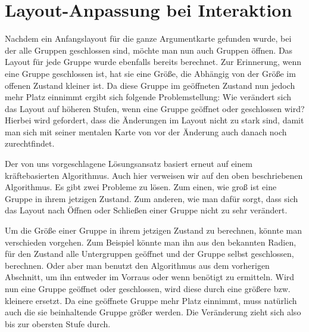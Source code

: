

\section{Layout-Anpassung bei Interaktion}%
Nachdem ein Anfangslayout für die ganze Argumentkarte gefunden wurde, bei der alle Gruppen geschlossen sind, möchte man nun auch Gruppen öffnen. 
Das Layout für jede Gruppe wurde ebenfalls bereits berechnet. Zur Erinnerung, wenn eine Gruppe geschlossen ist, hat sie eine Größe, 
die Abhängig von der Größe im offenen Zustand kleiner ist. 
Da diese Gruppe im geöffneten Zustand nun jedoch mehr Platz einnimmt ergibt sich folgende Problemstellung:
Wie verändert sich das Layout auf höheren Stufen, wenn eine Gruppe geöffnet oder geschlossen wird? 
Hierbei wird gefordert, dass die Änderungen im Layout nicht zu stark sind, damit man sich mit seiner mentalen Karte von vor der Änderung auch danach noch zurechtfindet.

Der von uns vorgeschlagene Lösungsansatz basiert erneut auf einem kräftebasierten Algorithmus. 
Auch hier verweisen wir auf den oben beschriebenen Algorithmus. Es gibt zwei Probleme zu lösen. 
Zum einen, wie groß ist eine Gruppe in ihrem jetzigen Zustand.  
Zum anderen, wie man dafür sorgt, dass sich das Layout nach Öffnen oder Schließen einer Gruppe nicht zu sehr verändert.

Um die Größe einer Gruppe in ihrem jetzigen Zustand zu berechnen, könnte man verschieden vorgehen. 
Zum Beispiel könnte man ihn aus den bekannten Radien, für den Zustand alle Untergruppen geöffnet und der Gruppe selbst geschlossen, berechnen. 
Oder aber man benutzt den Algorithmus aus dem vorherigen Abschnitt, um ihn entweder im Vorraus oder wenn benötigt zu ermitteln. 
Wird nun eine Gruppe geöffnet oder geschlossen, wird diese durch eine größere bzw. kleinere ersetzt. 
Da eine geöffnete Gruppe mehr Platz einnimmt, muss natürlich auch die sie beinhaltende Gruppe größer werden. 
Die Veränderung zieht sich also bis zur obersten Stufe durch.


